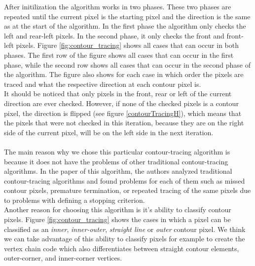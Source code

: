 \documentclass[thesis.tex]{subfiles}
\begin{document}
After initilization the algorithm works in two phases. These two phases are repeated until the current pixel is the starting pixel and the direction is the same as at the start of the algorithm. In the first phase the algorithm only checks the left and rear-left pixels. In the second phase, it only checks the front and front-left pixels. Figure \ref{fig:contour_tracing} shows all cases that can occur in both phases. The first row of the figure shows all cases that can occur in the first phase, while the second row shows all cases that can occur in the second phase of the algorithm. The figure also shows for each case in which order the pixels are traced and what the respective direction at each contour pixel is. \\
It should be noticed that only pixels in the front, rear or left of the current direction are ever checked. However, if none of the checked pixels is a contour pixel, the direction is flipped (see figure \ref{contourTracingH}), which means that the pixels that were not checked in this iteration, because they are on the right side of the current pixel, will be on the left side in the next iteration.  \\ \\
The main reason why we chose this particular contour-tracing algorithm is because it does not have the problems of other traditional contour-tracing algorithms. In the paper of this algorithm, the authors analyzed traditional contour-tracing algorithms and found problems for each of them such as missed contour pixels, premature termination, or repeated tracing of the same pixels due to problems with defining a stopping criterion. \\
Another reason for choosing this algorithm is it's ability to classify contour pixels. Figure \ref{fig:contour_tracing} shows the cases in which a pixel can be classified as an \textit{inner}, \textit{inner-outer}, \textit{straight line} or \textit{outer} contour pixel. We think we can take advantage of this ability to classify pixels for example to create the vertex chain code which also differentiates between straight contour elements, outer-corner, and  inner-corner vertices.


\newcommand{\figcontourwidth}{3.5}
\newcommand{\figcontourfirstOffset}{0}
\newcommand{\figcontousecondOffset}{4.5}
\newcommand{\figcontouthirdOffset}{9}
\newcommand{\figcontoufourthOffset}{13.5}
\newcommand{\figcontousecondRowYOffset}{4.5}	
\end{document}
